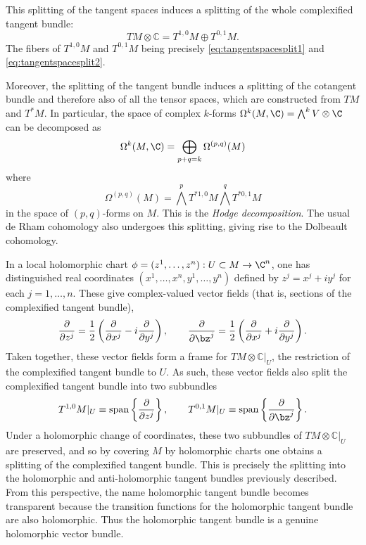 \documentclass{worksheetclass}
\begin{document}
        This splitting of the tangent spaces induces a splitting of the whole complexified tangent bundle:
        \begin{equation}
            TM\otimes \mathbb{C} =T^{1,0}M\oplus T^{0,1}M.
        \end{equation}
        The fibers of $T^{1,0}M$ and $T^{0,1}M$ being precisely \eqref{eq:tangentspacesplit1} and \eqref{eq:tangentspacesplit2}.

        Moreover, the splitting of the tangent bundle induces a splitting of the cotangent bundle and therefore also of all the tensor spaces, which are constructed from $TM$ and $T^*M$. In particular, the space of complex $k$-forms $\Omega^k(M,\C)={\textstyle\bigwedge^k V}\otimes\C$ can be decomposed as
        \begin{equation*}
            \Omega^k(M,\C) = \bigoplus_{p+q=k}\Omega^{(p,q)}(M)
        \end{equation*}
        where
        \begin{equation*}
            \Omega^{(p,q)}(M) = \bigwedge^pT^{*1,0}M\bigwedge^qT^{*0,1}M
        \end{equation*}
        in the space of $(p,q)$-forms on $M$. This is the \emph{Hodge decomposition}. The usual de Rham cohomology also undergoes this splitting, giving rise to the Dolbeault cohomology.

        In a local holomorphic chart $\phi=(z^1,\dots,z^n):U\subset M\to\C^n$, one has distinguished real coordinates $(x^{1},\dots ,x^{n},y^{1},\dots ,y^{n})$ defined by $z^j=x^j+iy^j$ for each $j=1,\dots,n$. These give complex-valued vector fields (that is, sections of the complexified tangent bundle),
        \begin{equation}
            \pdv{}{z^j}=\frac{1}{2}\left( \pdv{}{x^j}-i\pdv{}{y^j} \right),\qquad \pdv{}{\bz^j}=\frac{1}{2}\left( \pdv{}{x^j}+i\pdv{}{y^j} \right).
        \end{equation}
        Taken together, these vector fields form a frame for $TM\otimes \mathbb{C}|_U$, the restriction of the complexified tangent bundle to $U$. As such, these vector fields also split the complexified tangent bundle into two subbundles
        \begin{equation}
            T^{1,0}M|_U\equiv\text{span}\left\{\pdv{}{z^j}\right\},\qquad  T^{0,1}M|_U\equiv\text{span}\left\{\pdv{}{\bz^j}\right\}.
        \end{equation}
        Under a holomorphic change of coordinates, these two subbundles of $TM\otimes \mathbb{C}|_U$ are preserved, and so by covering $M$ by holomorphic charts one obtains a splitting of the complexified tangent bundle. This is precisely the splitting into the holomorphic and anti-holomorphic tangent bundles previously described. From this perspective, the name holomorphic tangent bundle becomes transparent because the transition functions for the holomorphic tangent bundle are also holomorphic. Thus the holomorphic tangent bundle is a genuine holomorphic vector bundle.
\end{document}
